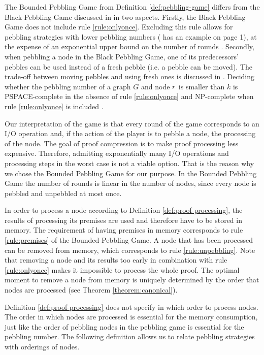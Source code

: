 The Bounded Pebbling Game from Definition \ref{def:pebbling-game} differs from the Black Pebbling Game discussed in \cite{Hertel2007,Pippenger1982} in two aspects. 
Firstly, the Black Pebbling Game does not include rule \ref{rule:onlyonce}. 
Excluding this rule allows for pebbling strategies with lower pebbling numbers (\cite{Sethi1975} has an example on page 1), at the expense of an exponential upper bound on the number of rounds \cite{EmdeBoas1979}.
Secondly, when pebbling a node in the Black Pebbling Game, one of its predecessors' pebbles can be used instead of a fresh pebble (i.e. a pebble can be moved). 
The trade-off between moving pebbles and using fresh ones is discussed in \cite{EmdeBoas1979}. 
Deciding whether the pebbling number of a graph $G$ and node $r$ is smaller than $k$ is PSPACE-complete in the absence of rule \ref{rule:onlyonce} \cite{Gilbert1980} and NP-complete when rule \ref{rule:onlyonce} is included \cite{Sethi1975}.

Our interpretation of the game is that every round of the game corresponds to an I/O operation and, if the action of the player is to pebble a node, the processing of the node.
The goal of proof compression is to make proof processing less expensive.
Therefore, admitting exponentially many I/O operations and processing steps in the worst case is not a viable option.
That is the reason why we chose the Bounded Pebbling Game for our purpose.
In the Bounded Pebbling Game the number of rounds is linear in the number of nodes, since every node is pebbled and unpebbled at most once.

In order to process a node according to Definition \ref{def:proof-processing}, the results of processing its premises are used and therefore have to be stored in memory.
The requirement of having premises in memory corresponds to rule \ref{rule:premises} of the Bounded Pebbling Game. 
A node that has been processed can be removed from memory, which corresponds to rule \ref{rule:unpebbling}.
Note that removing a node and its results too early in combination with rule \ref{rule:onlyonce} makes it impossible to process the whole proof.
The optimal moment to remove a node from memory is uniquely determined by the order that nodes are processed (see Theorem \ref{theorem:canonical}).

Definition \ref{def:proof-processing} does not specify in which order to process nodes.
The order in which nodes are processed is essential for the memory consumption, just like the order of pebbling nodes in the pebbling game is essential for the pebbling number.
The following definition allows us to relate pebbling strategies with orderings of nodes.

